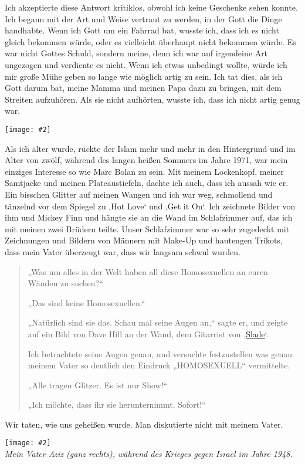 \documentclass[12pt]{memoir}
\newcommand{\img}[3]{\begin{center}%
\texttt{[image: \#2]}\\{\small\em#3}%
\end{center}}
\begin{document}
Ich akzeptierte diese Antwort kritiklos,
obwohl ich keine Geschenke sehen konnte.
Ich begann mit der Art und Weise vertraut zu werden,
in der Gott die Dinge handhabte.
Wenn ich Gott um ein Fahrrad bat, wusste ich,
dass ich es nicht gleich bekommen würde,
oder es vielleicht überhaupt nicht bekommen würde.
Es war nicht Gottes Schuld, sondern meine,
denn ich war auf irgendeine Art ungezogen und verdiente es nicht.
Wenn ich etwas unbedingt wollte,
würde ich mir große Mühe geben so lange wie möglich artig zu sein.
Ich tat dies, als ich Gott darum bat,
meine Mamma und meinen Papa dazu zu bringen,
mit dem Streiten aufzuhören.
Als sie nicht aufhörten, wusste ich, dass ich nicht artig genug war.

\img{scale=1}{Hassan_Boy.jpg}{}

Als ich älter wurde, rückte der Islam mehr und mehr in den Hintergrund
und im Alter von zwölf, während des langen heißen Sommers im Jahre 1971,
war mein einziges Interesse so wie Marc Bolan zu sein.
Mit meinem Lockenkopf, meiner Samtjacke und meinen Plateaustiefeln,
dachte ich auch, dass ich aussah wie er.
Ein bisschen Glitter auf meinen Wangen und ich war weg,
schmollend und tänzelnd vor dem Spiegel zu ‚Hot Love‘ und ‚Get it On‘.
Ich zeichnete Bilder von ihm und Mickey Finn und hängte sie an die Wand
im Schlafzimmer auf, das ich mit meinen zwei Brüdern teilte.
Unser Schlafzimmer war so sehr zugedeckt mit Zeichnungen
und Bildern von Männern mit Make-Up und hautengen Trikots,
dass mein Vater überzeugt war, dass wir langsam schwul wurden.

\begin{quote}
„Was um alles in der Welt haben all diese Homosexuellen
an euren Wänden zu suchen?“

„Das sind keine Homosexuellen.“

„Natürlich sind sie das. Schau mal seine Augen an,“ sagte er,
und zeigte auf ein Bild von Dave Hill an der Wand,
dem Gitarrist von ‚\href{http://de.wikipedia.org/wiki/Slade}{Slade}‘.

Ich betrachtete seine Augen genau, und versuchte festzustellen
was genau meinem Vater so deutlich den Eindruck „HOMOSEXUELL“ vermittelte.

„Alle tragen Glitzer. Es ist nur Show!“

„Ich möchte, dass ihr sie herunternimmt. Sofort!“
\end{quote}

Wir taten, wie uns geheißen wurde. Man diskutierte nicht mit meinem Vater.

\img{scale=0.8}{Hassans_Father.jpg}
{Mein Vater Aziz (ganz rechts),
während des Krieges gegen Israel im Jahre 1948.}
\end{document}
